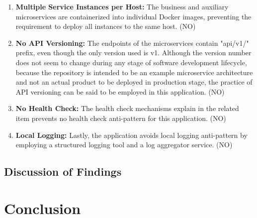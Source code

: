 \documentclass{Configuration_Files/PoliMi3i_thesis}
\begin{document}
\begin{enumerate}
    \item \textbf{Multiple Service Instances per Host:} The business and auxiliary microservices are containerized into individual Docker images, preventing the requirement to deploy all instances to the same host. (NO)
    
    \item \textbf{No API Versioning:} The endpoints of the microservices contain "api/v1/" prefix, even though the only version used is v1.
    Although the version number does not seem to change during any stage of software development lifecycle, because the repository is intended to be an example microservice architecture and not an actual product to be deployed in production stage, the practice of API versioning can be said to be employed in this application. (NO)
    
    \item \textbf{No Health Check:} The health check mechanisms explain in the related item prevents no health check anti-pattern for this application. (NO)
    
    \item \textbf{Local Logging:} Lastly, the application avoids local logging anti-pattern by employing a structured logging tool and a log aggregator service. (NO)
\end{enumerate}

\section{Discussion of Findings}
\label{sec:discussion}


\chapter{Conclusion}
\label{ch:conclusion}%




\end{document}
